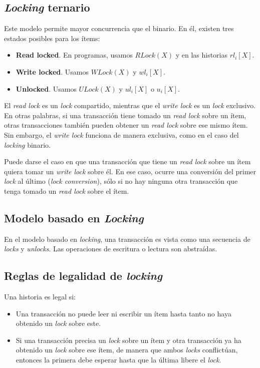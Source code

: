 \documentclass[english,titlepage]{article}
\theoremstyle{definition}
\theoremstyle{definition}
\begin{document}
\subsection{\emph{Locking} ternario}

Este modelo permite mayor concurrencia que el binario. En él, existen tres
estados posibles para los ítems:

\begin{itemize}
    \item \textbf{Read locked}. En programas, usamos $RLock(X)$ y en las
        historias $rl_i[X]$.
    \item \textbf{Write locked}. Usamos $WLock(X)$ y $wl_i[X]$.
    \item \textbf{Unlocked}. Usamos $ULock(X)$ y $ul_i[X]$ o $u_i[X]$.
\end{itemize}

El \emph{read lock} es un \emph{lock} compartido, mientras que el
\emph{write lock} es un \emph{lock} exclusivo. En otras palabras, si una
transacción tiene tomado un \emph{read lock} sobre un ítem, otras
transacciones también pueden obtener un \emph{read lock} sobre ese mismo ítem.
Sin embargo, el \emph{write lock} funciona de manera exclusiva, como en el
caso del \emph{locking} binario.

Puede darse el caso en que una transacción que tiene un \emph{read lock} sobre
un ítem quiera tomar un \emph{write lock} sobre él. En ese caso, ocurre una
conversión del primer \emph{lock} al último (\emph{lock conversion}), sólo si
no hay ninguna otra transacción que tenga tomado un \emph{read lock} sobre el
ítem.

\subsection{Modelo basado en \emph{Locking}}

En el modelo basado en \emph{locking}, una transacción es vista como una
secuencia de \emph{locks} y \emph{unlocks}. Las operaciones de escritura o
lectura son abstraídas.

\subsection{Reglas de legalidad de \emph{locking}}

Una historia es legal si:

\begin{itemize}
    \item Una transacción no puede leer ni escribir un ítem hasta tanto no
        haya obtenido un \emph{lock} sobre este.
    \item Si una transacción precisa un \emph{lock} sobre un ítem y
        otra transacción ya ha obtenido un \emph{lock} sobre ese ítem, de
        manera que ambos \emph{locks} conflictúan, entonces la primera debe
        esperar hasta que la última libere el \emph{lock}.
\end{itemize}
        
\end{document}
